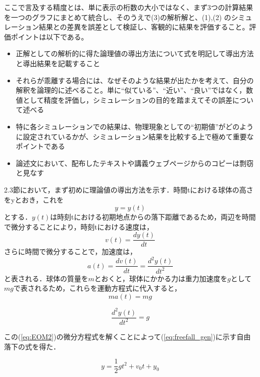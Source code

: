 \documentclass[12pt, xelatex,ja=standard,jafont=hiragino]{bxjsarticle}
\begin{document}
ここで言及する精度とは、単に表示の桁数の大小ではなく、まず3つの計算結果を一つのグラフにまとめて統合し、そのうえで(3)の解析解と、(1),(2) のシミュレーション結果との差異を誤差として検証し、客観的に結果を評価すること。評価ポイントは以下である。
\begin{itemize}
    \item 正解としての解析的に得た論理値の導出方法について式を明記して導出方法と導出結果を記載すること
    \item それらが乖離する場合には、なぜそのような結果が出たかを考えて、自分の解釈を論理的に述べること。単に``似ている''、``近い''、``良い''ではなく，数値として精度を評価し，シミュレーションの目的を踏まえてその誤差について述べる
    \item 特に各シミュレーションでの結果は、物理現象としての``初期値''がどのように設定されているかが、シミュレーション結果を比較する上で極めて重要なポイントである
    \item 論述文において、配布したテキストや講義ウェブページからのコピーは剽窃と見なす
\end{itemize}
\fi
2.3節において，まず初めに理論値の導出方法を示す．時間tにおける球体の高さをyとおき，これを
\begin{equation} \label{eq:set_y}
    y=y(t)
\end{equation}
 とする．$y(t)$は時刻tにおける初期地点からの落下距離であるため，両辺を時間で微分することにより，時刻tにおける速度は，
\begin{equation} \label{eq:set_v}
    v(t)=\frac{dy(t)}{dt}
\end{equation}
さらに時間で微分することで，加速度は，
\begin{equation} \label{eq:set_a}
    a(t)=\frac{dv(t)}{dt}=\frac{d^2y(t)}{dt^2}
\end{equation}
と表される．球体の質量を$m$とおくと，球体にかかる力は重力加速度を$g$として$mg$で表されるため，これらを運動方程式に代入すると，
\begin{equation} \label{eq:EOM1}
    ma(t)=mg
\end{equation}

\begin{equation} \label{eq:EOM2}
    \frac{d^2y(t)}{dt^2}=g
\end{equation}

この(\ref{eq:EOM2})の微分方程式を解くことによって(\ref{eq:freefall_gen})に示す自由落下の式を得た．

\begin{equation} \label{eq:freefall_gen}
    y=\frac{1}{2}gt^2+v_0t+y_0
\end{equation}
\end{document}
